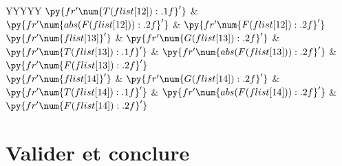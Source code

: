 \documentclass[../main/main.tex]{subfiles}
\begin{document}
{\begin{center}
\begin{tabularx}{\linewidth}{YYYYY}
			$\py{fr'\num{{{T(flist[12]):.1f}}}'}$      &
			$\py{fr'\num{{{abs(F(flist[12])):.2f}}}'}$ &
			$\py{fr'\num{{{F(flist[12]):.2f}}}'}$
			\\
			$\py{fr'\num{{{flist[13]}}}'}$             &
			$\py{fr'\num{{{G(flist[13]):.2f}}}'}$      &
			$\py{fr'\num{{{T(flist[13]):.1f}}}'}$      &
			$\py{fr'\num{{{abs(F(flist[13])):.2f}}}'}$ &
			$\py{fr'\num{{{F(flist[13]):.2f}}}'}$
			\\
			$\py{fr'\num{{{flist[14]}}}'}$             &
			$\py{fr'\num{{{G(flist[14]):.2f}}}'}$      &
			$\py{fr'\num{{{T(flist[14]):.1f}}}'}$      &
			$\py{fr'\num{{{abs(F(flist[14])):.2f}}}'}$ &
			$\py{fr'\num{{{F(flist[14]):.2f}}}'}$
			\\
			\bottomrule
		\end{tabularx}
		\label{tab:ddb_corr}
	\end{center}

}

\section{Valider et conclure}

\end{document}
